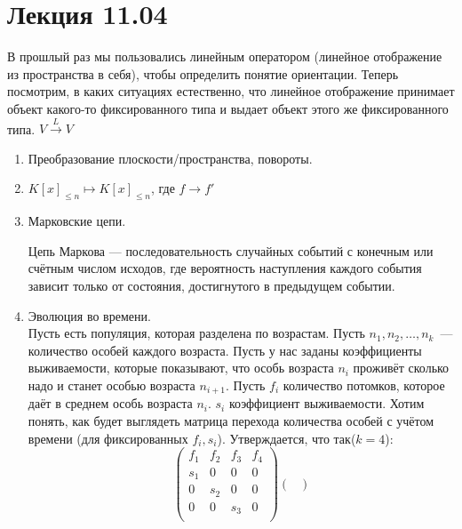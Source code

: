 \section{Лекция 11.04}
\begin{motivation}
    В прошлый раз мы пользовались линейным оператором (линейное отображение из пространства в себя), чтобы определить понятие ориентации. Теперь посмотрим, в каких ситуациях естественно, что линейное отображение принимает объект какого-то фиксированного типа и выдает объект этого же фиксированного типа. $V\xrightarrow{L}V$
\end{motivation}
\begin{examples}
    \begin{enumerate}
        \item Преобразование плоскости/пространства, повороты.
        \item $K[x]_{\le n} \mapsto K[x]_{\le n}$, где  $f\rightarrow f'$
        \item Марковские цепи. \\
        \begin{definition}
            \label{def:Марков}
            Цепь Маркова — последовательность случайных событий с конечным или счётным числом исходов, где вероятность наступления каждого события зависит только от состояния, достигнутого в предыдущем событии.
        \end{definition}
        \item Эволюция во времени.\\
            Пусть есть популяция, которая разделена по возрастам. Пусть $n_1, n_2,\dots, n_k$~--- количество особей каждого
            возраста. Пусть у нас заданы коэффициенты выживаемости, которые показывают, что особь возраста $n_i$ проживёт
            сколько надо и станет особью возраста $n_{i+1}$. Пусть $f_i$ количество потомков, которое даёт в среднем особь возраста $n_i$.
            $s_i$ коэффициент выживаемости. 
            Хотим понять, как будет выглядеть матрица перехода количества особей с учётом времени (для фиксированных $f_i, s_i$). Утверждается, что так($k = 4$):
            \[
            \begin{pmatrix}
                f_1&f_2&f_3&f_4\\
                s_1&0&0&0\\
                0&s_2&0&0\\
                0&0&s_3&0\\
            \end{pmatrix}
            \begin{pmatrix}

\end{pmatrix}\]
\end{enumerate}
\end{examples}
